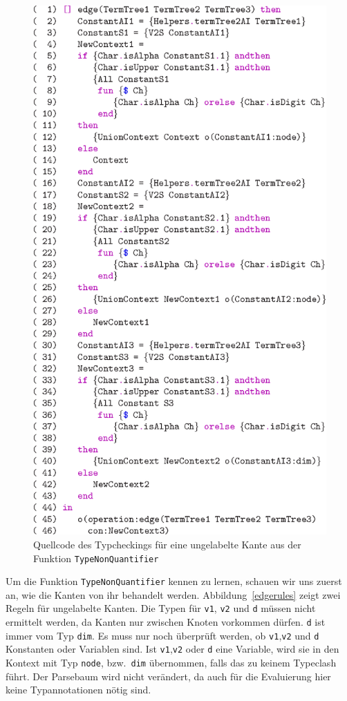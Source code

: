 \begin{figure}
\begin{center}
\includegraphics[scale=1.0]{eps/edge_n}
\end{center}
\caption{Quellcode des Typcheckings f\"ur eine ungelabelte Kante aus
  der Funktion {\tt TypeNonQuantifier}}
\label{edgecode}
\end{figure}

Um die Funktion {\tt TypeNonQuantifier} kennen zu lernen, schauen wir
uns zuerst an, wie die Kanten von ihr behandelt werden.
Abbildung~\ref{edgerules} zeigt zwei Regeln f\"ur ungelabelte Kanten.
Die Typen f\"ur {\tt v1}, {\tt v2} und {\tt d} m\"ussen nicht
ermittelt werden, da Kanten nur zwischen Knoten vorkommen d\"urfen.
{\tt d} ist immer vom Typ {\tt dim}. Es muss nur noch \"uberpr\"uft
werden, ob {\tt v1},{\tt v2} und {\tt d} Konstanten oder Variablen
sind. Ist {\tt v1},{\tt v2} oder {\tt d} eine Variable, wird sie in
den Kontext mit Typ {\tt node}, bzw.\ {\tt dim} \"ubernommen, falls das
zu keinem Typeclash f\"uhrt.  Der Parsebaum wird nicht ver\"andert, da
auch f\"ur die Evaluierung hier keine Typannotationen n\"otig sind.


